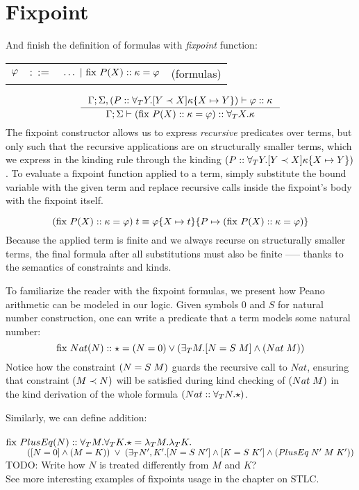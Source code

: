 \documentclass[english, mgr]{iithesis}
\renewcommand{\it}[1]{\textit{#1}}
\begin{document}
\section{Fixpoint}
\newcommand{\fix}[3]{\ensuremath{\text{fix }#1(#2)\ofkind#3=}}
And finish the definition of formulas with \it{fixpoint} function:

\begin{tabular}{rrlr}
$\varphi$ & $::=$ & $\ldots
               \bnfor \fix{\propv}{\termv}{\kind}{\formphi} $
    & (formulas)
\end{tabular}
$$
\inference{
  \cEnv;\kEnv, (\propv \ofkind \kForallTerm{Y} \kGuard{Y \cshlt \termv}{\kind\subst{\termv}{Y}})\vdash \formphi \ofkind \kind
}{
  \cEnv;\kEnv\vdash (\fix{\propv}{\termv}{\kind}{\formphi}) \ofkind \kForallTerm{\termv}{\kind}
}
$$
The fixpoint constructor allows us to express \it{recursive} predicates over terms,
but only such that the recursive applications are on structurally smaller terms,
which we express in the kinding rule through the kinding $(P :: \forall_T Y . [Y \prec X]{\kappa\{X\mapsto Y\}})$.
To evaluate a fixpoint function applied to a term, simply substitute the bound
variable with the given term and replace recursive calls inside the fixpoint's body with the fixpoint itself.

$$
(\fix{\propv}{\termv}{\kind}{\formphi})\fApp\term
\equiv
\formphi\subst{\termv}{\term}\subst{\propv}{(\fix{\propv}{\termv}{\kind}{\formphi})}
$$
Because the applied term is finite
and we always recurse on structurally smaller terms,
the final formula after all substitutions must also be finite
--— thanks to the semantics of constraints and kinds.

To familiarize the reader with the fixpoint formulas,
we present how Peano arithmetic can be modeled in our logic.
Given symbols $0$ and $S$ for natural number construction,
one can write a predicate that a term models some natural number:
$$
\fix{Nat}{N}{\kProp}{(N \ceq 0) \vee (\fExistsTerm{M} \fCAnd{N \ceq {S \tapp M}} ({Nat}\fAppTerm{M}))}
$$
Notice how the constraint $(N = {S \; M})$ guards the recursive call to $Nat$,
ensuring that constraint $(M \prec N)$ will be satisfied during kind checking of
$({{Nat}\;M})$ in the kind derivation of the whole formula
$({Nat} :: \forall_T N .{\star})$.

Similarly, we can define addition: \\ \\
$\fix{PlusEq}{N}{\kForallTerm{M}\kForallTerm{K}\kProp}{\fLamTerm{M}\fLamTerm{K}}$ \\
$\text{ }\qquad
  ([N = 0]\wedge{(M =K)}) \;\vee\;
   (\exists_T N', K' .[N = {S \; N'}]\wedge[K = {S \; K'}]\wedge{({PlusEq}\;{N'}\;{M}\;{K'})}
   )
$
\\
TODO: Write how $N$ is treated differently from $M$ and $K$?
\\
See more interesting examples of fixpoints usage in the chapter on STLC.
\end{document}
